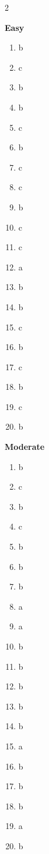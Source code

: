 \documentclass[12pt,a4paper]{exam}
\begin{document}
\begin{multicols}{2}

	\textbf{Easy}

	\begin{enumerate}[
			label=\arabic*.,
			leftmargin=*,
			itemsep=2pt
		]
		\item b
		\item c
		\item b
		\item b
		\item c
		\item b
		\item c
		\item c
		\item b
		\item c
		\item c
		\item a
		\item b
		\item b
		\item c
		\item b
		\item c
		\item b
		\item c
		\item b
	\end{enumerate}

	\textbf{Moderate}

	\begin{enumerate}[
			label=\arabic*.,
			leftmargin=*,
			itemsep=2pt,
			start=21
		]
		\item b
		\item c
		\item b
		\item c
		\item b
		\item b
		\item b
		\item a
		\item a
		\item b
		\item b
		\item b
		\item b
		\item b
		\item a
		\item b
		\item b
		\item b
		\item a
		\item b
	\end{enumerate}


\end{multicols}
\end{document}
